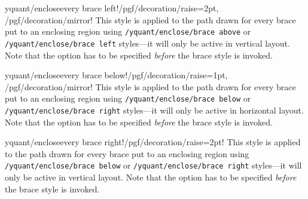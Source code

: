 \documentclass{scrartcl}
\makeatletter
\let\unpatched@minted@inline@iii=\minted@inline@iii%
\def\patched@minted@inline@iii#1{%
      \unpatched@minted@inline@iii{#1}%
      \par%
      \endgroup\egroup\nopagebreak\vskip-\parskip\nopagebreak%
      \noindent\ignorespaces%
   }
\def\patch@mintinline{%
      \let\minted@inline@iii=\patched@minted@inline@iii%
   }
\let\unpatched@RobustMintInlineProcess@ii=\RobustMintInlineProcess@ii
\def\patched@RobustMintInlineProcess@ii#1{%
      \unpatched@RobustMintInlineProcess@ii{#1}%
      \par%
      \endgroup\egroup\nopagebreak\vskip-\parskip\nopagebreak%
      \noindent\ignorespaces%
   }
\def\patch@mintinline{%
      \let\RobustMintInlineProcess@ii=\patched@RobustMintInlineProcess@ii%
   }
\newenvironment{option*}[3][]{\ifhmode\par\fi\addvspace{5mm}%
   \vbox\bgroup\begingroup%
      \patch@mintinline%
      \raggedleft%
      \hspace*{-1cm}%
      \phantomsection\label{yquant:/#2/#3}%
      \texttt{\ifstrempty{#1}\relax{\compat{#1}}\textcolor{gray}{/#2/}\textcolor{mintgreen}{#3}}\hfill default: %
      \tex}{\par\addvspace{5mm}}
\def\ttlink{\link\texttt}
\makeatother
\begin{document}

               \begin{option*}{yquant/enclose}{every brace left}!/pgf/decoration/raise=2pt, /pgf/decoration/mirror!
                  This style is applied to the path drawn for every brace put to an enclosing region using \ttlink{/yquant/enclose/brace above} or \ttlink{/yquant/enclose/brace left} styles---it will only be active in vertical layout.
                  Note that the option has to be specified \emph{before} the brace style is invoked.
               \end{option*}


               \begin{option*}{yquant/enclose}{every brace below}!/pgf/decoration/raise=1pt, /pgf/decoration/mirror!
                  This style is applied to the path drawn for every brace put to an enclosing region using \ttlink{/yquant/enclose/brace below} or \ttlink{/yquant/enclose/brace right} styles---it will only be active in horizontal layout.
                  Note that the option has to be specified \emph{before} the brace style is invoked.
               \end{option*}


               \begin{option*}{yquant/enclose}{every brace right}!/pgf/decoration/raise=2pt!
                  This style is applied to the path drawn for every brace put to an enclosing region using \ttlink{/yquant/enclose/brace below} or \ttlink{/yquant/enclose/brace right} styles---it will only be active in vertical layout.
                  Note that the option has to be specified \emph{before} the brace style is invoked.
               \end{option*}
\end{document}
